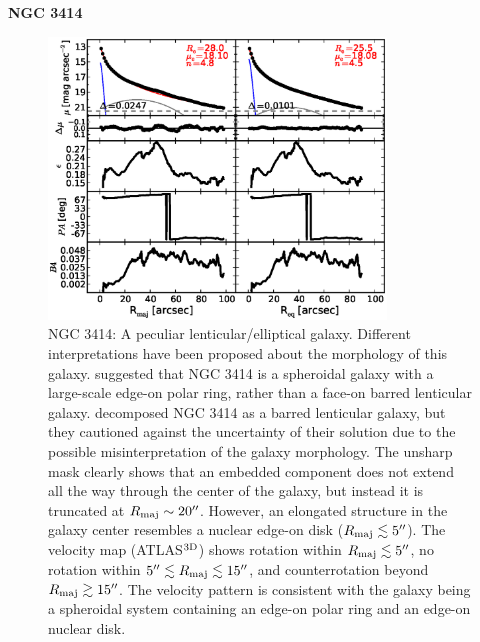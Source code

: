 \documentclass[preprint2]{emulateapj}
\newcommand{\fitfigurewidth}{0.8\textwidth}
\begin{document}
  \clearpage\newpage\noindent
  {\bf NGC 3414 \\}

  \begin{figure}[h]
  \begin{center}
  \includegraphics[width=\fitfigurewidth]{n3414_1Dfit.eps}
  \caption{NGC 3414: 
  A peculiar lenticular/elliptical galaxy. 
  Different interpretations have been proposed about the morphology of this galaxy.
  \cite{whitmore1990} suggested that NGC 3414 is a spheroidal galaxy 
  with a large-scale edge-on polar ring, rather than a face-on barred lenticular galaxy.
  \cite{laurikainen2010} decomposed NGC 3414 as a barred lenticular galaxy, but 
  they cautioned against the uncertainty of their solution due to the possible misinterpretation of the galaxy morphology.
  The unsharp mask clearly shows that an embedded component does not extend all the way through the 
  center of the galaxy, but instead it is truncated at $R_{\rm maj} \sim 20''$.
  However, an elongated structure in the galaxy center resembles a nuclear edge-on disk ($R_{\rm maj} \lesssim 5''$).
  The velocity map (ATLAS$^{\rm 3D}$) shows rotation within $R_{\rm maj} \lesssim 5''$, no rotation within $5'' \lesssim R_{\rm maj} \lesssim 15''$,
  and counterrotation beyond $R_{\rm maj} \gtrsim 15''$.
  The velocity pattern is consistent with the galaxy being a spheroidal system containing an edge-on polar ring and an edge-on nuclear disk.
  }
  \end{center}
  \end{figure}
\end{document}
